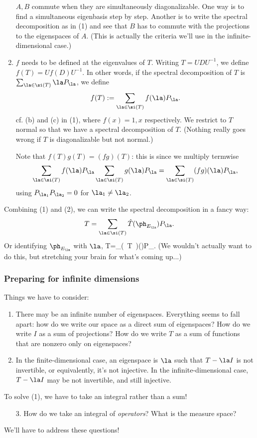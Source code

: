\begin{enumerate}
$A,B$ commute when they are simultaneously diagonalizable. One way is to find a simultaneous eigenbasis step by step. Another is to write the spectral decomposition as in (1) and see that $B$ has to commute with the projections to the eigenspaces of $A$. (This is actually the criteria we'll use in the infinite-dimensional case.)
\item
$f$ needs to be defined at the eigenvalues of $T$. Writing $T=UDU^{-1}$, we define $f(T)=Uf(D)U^{-1}$. In other words, if the spectral decomposition of $T$ is $\sum_{\la\in \si(T)}\la P_{\la}$, we define
\[
f(T):=\sum_{\la\in \si(T)}f(\la)P_{\la}.
\]
cf. (b) and (c) in (1), where $f(x)=1, x$ respectively.
We restrict to $T$ normal so that we have a spectral decomposition of $T$.
(Nothing really goes wrong if $T$ is diagonalizable but not normal.)

Note that $f(T)g(T)=(fg)(T)$: this is since we multiply termwise \[\sum_{\la\in \si(T)}f(\la)P_{\la}\sum_{\la\in \si(T)}g(\la)P_{\la}=\sum_{\la\in \si(T)}(fg)(\la)P_{\la},\]
using $P_{\la_1}P_{\la_2}=0$ for $\la_1\ne \la_2$.
\end{enumerate}
Combining (1) and (2), we can write the spectral decomposition in a fancy way:
\[
T=\sum_{\la\in \si(T)}\hat{T}(\ph_{E_{\la}})P_{\la}.
\]
Or identifying $\ph_{E_{\la}}$ with $\la$,
T=\sum_{\la\in \si(T)}(\la)P_{\la}.
\eeq
(We wouldn't actually want to do this, but stretching your brain for what's coming up...)

\subsubsection{Preparing for infinite dimensions}

Things we have to consider:
\begin{enumerate}
\item
There may be an infinite number of eigenspaces. Everything seems to fall apart: how do we write our space as a direct sum of eigenspaces? How do we write $I$ as a sum of projections? How do we write $T$ as a sum of functions that are nonzero only on eigenspaces?
\item
In the finite-dimensional case, an eigenspace is $\la$ such that $T-\la I$ is not invertible, or equivalently, it's not injective. In the infinite-dimensional case, $T-\la I$ may be not invertible, and still injective. 
\end{enumerate}
To solve (1), we have to take an integral rather than a sum!
\begin{enumerate}
\item[3.] How do we take an integral of {\it operators}? What is the measure space?
\end{enumerate}
We'll have to address these questions!
